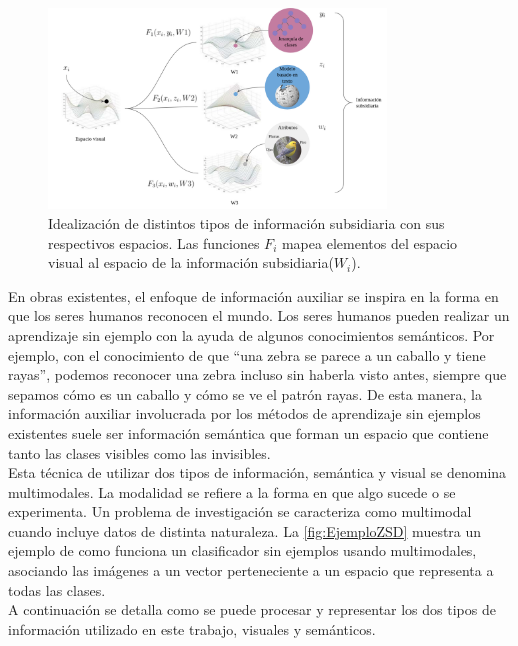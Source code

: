 \begin{figure}[]
	\centering
	\includegraphics[width=0.8\textwidth]{img/modales.png}
	\caption{Idealización de distintos tipos de información subsidiaria con sus respectivos espacios. Las funciones $F_i$ mapea elementos del espacio visual al espacio de la información subsidiaria($W_i$).}
	\label{fig:modales}
\end{figure}

En obras existentes, el enfoque de información auxiliar se inspira en la forma en que los seres humanos reconocen el mundo. Los seres humanos pueden realizar un aprendizaje sin ejemplo con la ayuda de algunos conocimientos semánticos. Por ejemplo, con el conocimiento de que ``una zebra se parece a un caballo y tiene rayas'', podemos reconocer una zebra incluso sin haberla visto antes, siempre que sepamos cómo es un caballo y cómo se ve el patrón rayas. De esta manera, la información auxiliar involucrada por los métodos de aprendizaje sin ejemplos existentes suele ser información semántica que forman un espacio que contiene tanto las clases visibles como las invisibles.\\

Esta técnica de utilizar dos tipos de información, semántica y visual se denomina multimodales. La modalidad se refiere a la forma en que algo sucede o se experimenta. Un problema de investigación se caracteriza como multimodal cuando incluye datos de distinta naturaleza. La \autoref{fig:EjemploZSD} muestra un ejemplo de como funciona un clasificador sin ejemplos usando multimodales, asociando las imágenes a un vector perteneciente a un espacio que representa a todas las clases.\\

A continuación se detalla como se puede procesar y representar los dos tipos de información utilizado en este trabajo, visuales y semánticos.

